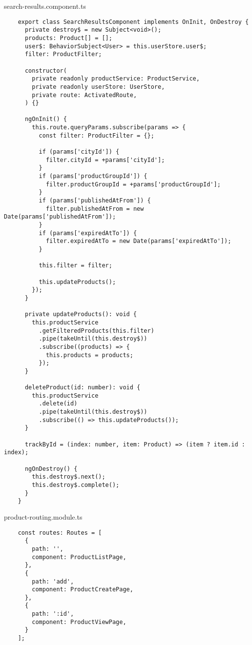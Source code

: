 search-results.component.ts
\begin{lstlisting}
    export class SearchResultsComponent implements OnInit, OnDestroy {
      private destroy$ = new Subject<void>();
      products: Product[] = [];
      user$: BehaviorSubject<User> = this.userStore.user$;
      filter: ProductFilter;
    
      constructor(
        private readonly productService: ProductService,
        private readonly userStore: UserStore,
        private route: ActivatedRoute,
      ) {}
    
      ngOnInit() {
        this.route.queryParams.subscribe(params => {
          const filter: ProductFilter = {};
    
          if (params['cityId']) {
            filter.cityId = +params['cityId'];
          }
          if (params['productGroupId']) {
            filter.productGroupId = +params['productGroupId'];
          }
          if (params['publishedAtFrom']) {
            filter.publishedAtFrom = new Date(params['publishedAtFrom']);
          }
          if (params['expiredAtTo']) {
            filter.expiredAtTo = new Date(params['expiredAtTo']);
          }
    
          this.filter = filter;
    
          this.updateProducts();
        });
      }
    
      private updateProducts(): void {
        this.productService
          .getFilteredProducts(this.filter)
          .pipe(takeUntil(this.destroy$))
          .subscribe((products) => {
            this.products = products;
          });
      }
    
      deleteProduct(id: number): void {
        this.productService
          .delete(id)
          .pipe(takeUntil(this.destroy$))
          .subscribe(() => this.updateProducts());
      }
    
      trackById = (index: number, item: Product) => (item ? item.id : index);
    
      ngOnDestroy() {
        this.destroy$.next();
        this.destroy$.complete();
      }
    }    
\end{lstlisting}

product-routing.module.ts
\begin{lstlisting}
    const routes: Routes = [
      {
        path: '',
        component: ProductListPage,
      },
      {
        path: 'add',
        component: ProductCreatePage,
      },
      {
        path: ':id',
        component: ProductViewPage,
      }
    ]; 
\end{lstlisting}

